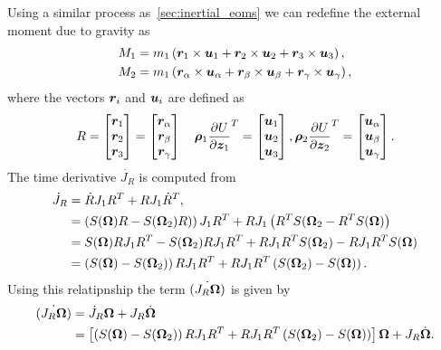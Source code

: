Using a similar process as~\cref{sec:inertial_eoms} we can redefine the external moment due to gravity as
\begin{align}
    M_1 &= m_1 \left( \bm{r}_1 \times \bm{u}_1 + \bm{r}_2 \times \bm{u}_2 + \bm{r}_3 \times \bm{u}_3 \right) , \\
    M_2 &= m_1 \left( \bm{r}_\alpha \times \bm{u}_\alpha + \bm{r}_\beta \times \bm{u}_\beta + \bm{r}_\gamma \times \bm{u}_\gamma \right) , 
\end{align}
where the vectors \( \bm{r}_i \) and \( \bm{u}_i \) are defined as
\begin{align*}
    R = \begin{bmatrix} \bm{r}_1 \\ \bm{r}_2 \\ \bm{r}_3 \end{bmatrix} = \begin{bmatrix} \bm{r}_\alpha \\ \bm{r}_\beta \\ \bm{r}_\gamma \end{bmatrix} \quad
    \bm{\rho}_1 \frac{\partial U}{\partial \bm{z}_1}^T = \begin{bmatrix} \bm{u}_1 \\ \bm{u}_2 \\ \bm{u}_3 \end{bmatrix}, \bm{\rho}_2 \frac{\partial U}{\partial \bm{z}_2}^T = \begin{bmatrix} \bm{u}_\alpha \\ \bm{u}_\beta \\ \bm{u}_\gamma \end{bmatrix} .
\end{align*}
The time derivative \( \dot{J_R}\) is computed from
\begin{align*}
    \dot{J}_R &= \dot{R} J_1 R^T + R J_1 \dot{R}^T , \\
    &= \left( S(\bm{\Omega})R - S(\bm{\Omega}_2) R) \right) J_1 R^T + R J_1 \left( R^T S(\bm{\Omega}_2 - R^T S(\bm{\Omega})  \right) \\
    &= S(\bm{\Omega}) R J_1 R^T - S(\bm{\Omega}_2) R J_1 R^T + R J_1 R^T S(\bm{\Omega}_2) - R J_1 R^T S(\bm{\Omega}) \\
    &=  \left( S(\bm{\Omega}) - S(\bm{\Omega}_2) \right) R J_1 R^T + R J_1 R^T \left( S(\bm{\Omega}_2) - S(\bm{\Omega}) \right) .
\end{align*}
Using this relatipnship the term \( \dot{\left( J_R \bm{\Omega} \right)}\) is given by
\begin{align*}
    \dot{\left( J_R \bm{\Omega} \right)} &= \dot{J}_R \bm{\Omega} + J_R \dot{\bm{\Omega}} \\
    &= \left[ \left( S(\bm{\Omega}) - S(\bm{\Omega}_2) \right) R J_1 R^T + R J_1 R^T \left( S(\bm{\Omega}_2) - S(\bm{\Omega}) \right) \right] \bm{\Omega} + J_R \dot{\bm{\Omega}} .
\end{align*}
